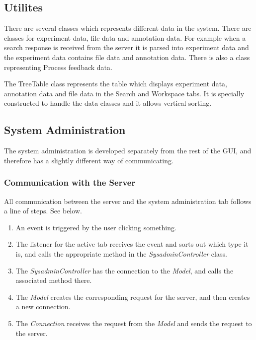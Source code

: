 \subsection{Utilites}

There are several classes which represents different data in the system. There are classes for experiment data, file data and annotation data. For example when a search response is received from the server it is parsed into experiment data and the experiment data contains file data and annotation data. There is also a class representing Process feedback data.

The TreeTable class represents the table which displays experiment data, annotation data and file data in the Search and Workspace tabs. It is specially constructed to handle the data classes and it allows vertical sorting.

\subsection{System Administration}
The system administration is developed separately from the rest of the GUI, and therefore has a slightly different way of communicating.

\subsubsection{Communication with the Server}
\label{Communication with the Server}

All communication between the server and the system administration tab follows a line of steps. See  below.

\begin{enumerate}

  \item An event is triggered by the user clicking something.
  \item The listener for the active tab receives the event and sorts out which type it is, and calls the appropriate method in the \textit{SysadminController} class.
  \item The \textit{SysadminController} has the connection to the \textit{Model}, and calls the associated method there.
  \item The \textit{Model} creates the corresponding request for the server, and then creates a new connection.
  \item The \textit{Connection} receives the request from the \textit{Model} and sends the request to the server.


\end{enumerate}

